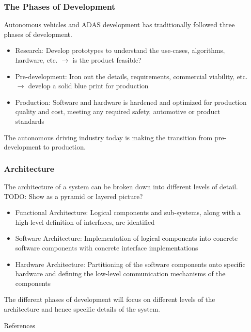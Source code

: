 \documentclass[aspectratio=169]{beamer}
\begin{document}
\begin{frame}
\frametitle{The Phases of Development}
Autonomous vehicles and ADAS development has traditionally followed three phases
of development.

\begin{itemize}
    \item Research: Develop prototypes to understand the use-cases, algorithms,
        hardware, etc. $\rightarrow$ is the product feasible?
    \item Pre-development: Iron out the details, requirements, commercial
        viability, etc. $\rightarrow$ develop a solid blue print for production
    \item Production: Software and hardware is hardened and optimized for
        production quality and cost, meeting any required safety, automotive or
        product standards
\end{itemize}
\pause
\begin{block}{}
The autonomous driving industry today is making the transition from
pre-development to production.
\end{block}
\end{frame}

\begin{frame}
\frametitle{Architecture}
The architecture of a system can be broken down into different levels
of detail.\\
TODO: Show as a pyramid or layered picture?\\
\begin{itemize}
    \item Functional Architecture: Logical components and sub-systems, along
        with a high-level definition of interfaces, are identified
    \item Software Architecture: Implementation of logical components into
        concrete software components with concrete interface implementations
    \item Hardware Architecture: Partitioning of the software components onto
        specific hardware and defining the low-level communication mechanisms
        of the components
\end{itemize}
The different phases of development will focus on different levels of
the architecture and hence specific details of the system.
\end{frame}







\begin{frame}[allowframebreaks]{References}
\renewcommand*{\bibfont}{\normalfont\scriptsize}
\printbibliography
\end{frame}
\end{document}
